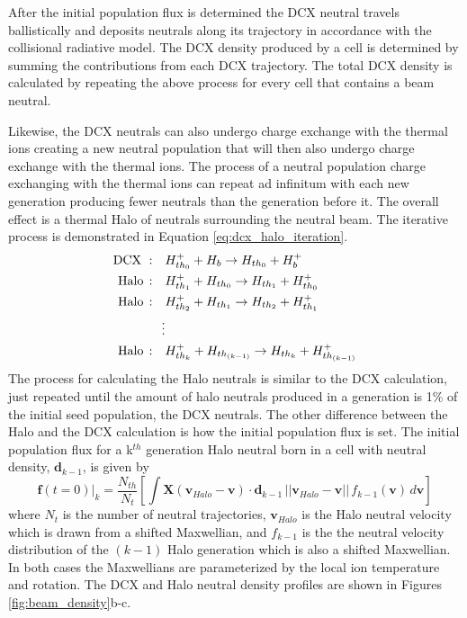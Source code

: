 After the initial population flux is determined the DCX neutral travels ballistically and deposits neutrals along its trajectory in accordance with the collisional radiative model. The DCX density produced by a cell is determined by summing the contributions from each DCX trajectory. The total DCX density is calculated by repeating the above process for every cell that contains a beam neutral.

Likewise, the DCX neutrals can also undergo charge exchange with the thermal ions creating a new neutral population that will then also undergo charge exchange with the thermal ions. The process of a neutral population charge exchanging with the thermal ions can repeat ad infinitum with each new generation producing fewer neutrals than the generation before it. The overall effect is a thermal Halo of neutrals surrounding the neutral beam. The iterative process is demonstrated in Equation \ref{eq:dcx_halo_iteration}.
\begin{equation}\label{eq:dcx_halo_iteration}
\begin{split}
\rm{DCX\,\,:} \quad &H_{th_0}^+ + H_b \rightarrow H_{th_0} + H_b^+\\
\rm{Halo\,:} \quad &H_{th_1}^+ + H_{th_0} \rightarrow H_{th_1} + H_{th_0}^+\\
\rm{Halo\,:} \quad &H_{th_2}^+ + H_{th_1} \rightarrow H_{th_2} + H_{th_1}^+ \\
\vdots \\
\rm{Halo\,:} \quad &H_{th_k}^+ + H_{th_{(k-1)}} \rightarrow H_{th_k} + H_{th_{(k-1)}}^+
\end{split}
\end{equation}
The process for calculating the Halo neutrals is similar to the DCX calculation, just repeated until the amount of halo neutrals produced in a generation is 1\% of the initial seed population, the DCX neutrals. The other difference between the Halo and the DCX calculation is how the initial population flux is set.
The initial population flux for a k$^{th}$ generation Halo neutral born in a cell with neutral density, $\mathbf{d}_{k-1}$, is given by
\begin{equation} \label{eq:dcx_rates}
    \mathbf{f}(t=0)|_k = \frac{N_{th}}{N_{t}} \left [ \int \mathbf{X}(\mathbf{v}_{Halo} - \mathbf{v}) \cdot \mathbf{d}_{k-1}\, ||\mathbf{v}_{Halo} - \mathbf{v}||\, f_{k-1}(\mathbf{v})\, d\mathbf{v} \right ]
\end{equation}
where $N_{t}$ is the number of neutral trajectories, $\mathbf{v}_{Halo}$ is the Halo neutral velocity which is drawn from a shifted Maxwellian, and $f_{k-1}$ is the the neutral velocity distribution of the $(k-1)$ Halo generation which is also a shifted Maxwellian. In both cases the Maxwellians are parameterized by the local ion temperature and rotation.
The DCX and Halo neutral density profiles are shown in Figures \ref{fig:beam_density}b-c.

